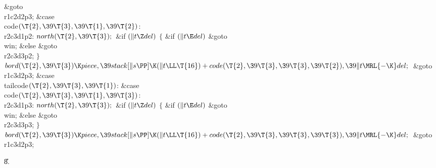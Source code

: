 \&{goto} \\{r1c2d2p3};\6
\4\&{case} \\{code}${}(\T{2},\39\T{3},\39\T{1},\39\T{2}){}$:\5
\\{r2c3d1p2}:\5
${}\\{north}(\T{2},\39\T{3});{}$\6
\&{if} ${}(\|t\Z\\{del}){}$\5
${}\{{}$\5
\1\&{if} ${}(\|t\E\\{del}){}$\1\5
\&{goto} \\{win};\5
\2\&{else}\1\5
\&{goto} \\{r2c3d3p2};\5
\2${}\}{}$\2\6
${}\\{bord}(\T{2},\39\T{3})\K\\{piece},\39\\{stack}[\|s\PP]\K(\|t\LL\T{16})+%
\\{code}(\T{2},\39\T{3},\39\T{3},\39\T{2}),\39\|t\MRL{-{\K}}\\{del};{}$\6
\&{goto} \\{r1c3d2p3};\6
\4\&{case} \\{tailcode}${}(\T{2},\39\T{3},\39\T{1}){}$:\5
\&{case} \\{code}${}(\T{2},\39\T{3},\39\T{1},\39\T{3}){}$:\5
\\{r2c3d1p3}:\5
${}\\{north}(\T{2},\39\T{3});{}$\6
\&{if} ${}(\|t\Z\\{del}){}$\5
${}\{{}$\5
\1\&{if} ${}(\|t\E\\{del}){}$\1\5
\&{goto} \\{win};\5
\2\&{else}\1\5
\&{goto} \\{r2c3d3p3};\5
\2${}\}{}$\2\6
${}\\{bord}(\T{2},\39\T{3})\K\\{piece},\39\\{stack}[\|s\PP]\K(\|t\LL\T{16})+%
\\{code}(\T{2},\39\T{3},\39\T{3},\39\T{3}),\39\|t\MRL{-{\K}}\\{del};{}$\6
\&{goto} \\{r1c3d2p3};\par
\U8.\fi

